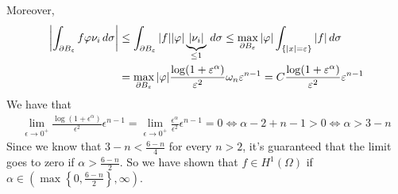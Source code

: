 Moreover,
\[
    \begin{split}
        \abs{\int_{\partial B_\varepsilon} f \varphi \nu_i \, d\sigma} & \leq \int_{\partial B_\varepsilon} \abs{f} \abs{\varphi} \underbrace{\abs{\nu_i}}_{\leq 1} \, d\sigma \leq \max_{\partial B_\varepsilon} \abs{\varphi} \int_{\{ \abs{x} = \varepsilon \}} \abs{f} \, d\sigma \\
                                                                 & = \max_{\partial B_\varepsilon} \abs{\varphi} \frac{\log(1+\varepsilon^\alpha)}{\varepsilon^2} \omega_n \varepsilon^{n-1} = C \frac{\log(1+\varepsilon^\alpha)}{\varepsilon^2} \varepsilon^{n-1}
    \end{split}
\]
We have that 
\[
    \begin{split}
        \lim_{\epsilon \to 0^+} \frac{\log(1+\epsilon^\alpha)}{\epsilon^2} \epsilon^{n-1} = \lim_{\epsilon \to 0^+} \frac{\epsilon^\alpha}{\epsilon^2} \epsilon^{n-1} = 0 \iff \alpha - 2 + n - 1 >  0 \iff \alpha > 3 - n
    \end{split}
\]
Since we know that $3 - n < \frac{6-n}{4}$ for every \(n > 2\), it's guaranteed that the limit goes to zero if \(\alpha > \frac{6-n}{2}\).
So we have shown that $f \in H^1(\Omega)$ if \(\alpha \in \left(\max\left\{0,  \frac{6-n}{2}\right\}, \infty\right)\).\\




